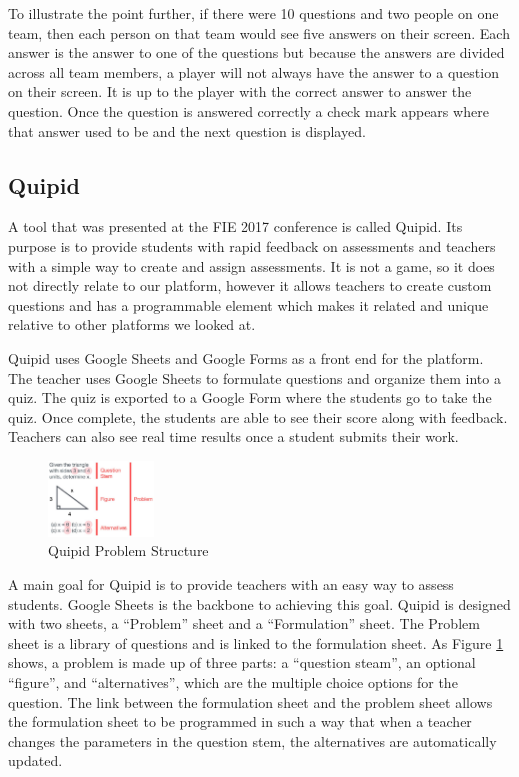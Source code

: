 \documentclass{article}
\begin{document}
        To illustrate the point further, if there were 10 questions and two people on one team, then each person on that team would see five answers on their screen. Each answer is the answer to one of the questions but because the answers are divided across all team members, a player will not always have the answer to a question on their screen. It is up to the player with the correct answer to answer the question. Once the question is answered correctly a check mark appears where that answer used to be and the next question is displayed.
    
    \subsection{Quipid}
        A tool that was presented at the FIE 2017 conference is called Quipid. Its purpose is to provide students with rapid feedback on assessments and teachers with a simple way to create and assign assessments. It is not a game, so it does not directly relate to our platform, however it allows teachers to create custom questions and has a programmable element which makes it related and unique relative to other platforms we looked at.
        \smallskip
        
        Quipid uses Google Sheets and Google Forms as a front end for the platform. The teacher uses Google Sheets to formulate questions and organize them into a quiz. The quiz is exported to a Google Form where the students go to take the quiz. Once complete, the students are able to see their score along with feedback. Teachers can also see real time results once a student submits their work.
        \smallskip
        \begin{figure}
            \centering
            \includegraphics[width=0.25\textwidth]{images/quipid-problem.png}
            \caption{Quipid Problem Structure \cite{quipid}}
            \label{fig:quipid-problem}
        \end{figure}
        \indent A main goal for Quipid is to provide teachers with an easy way to assess students. Google Sheets is the backbone to achieving this goal. Quipid is designed with two sheets, a ``Problem'' sheet and a ``Formulation'' sheet. The Problem sheet is a library of questions and is linked to the formulation sheet. As Figure \ref{fig:quipid-problem} shows, a problem is made up of three parts: a ``question steam'', an optional ``figure'', and ``alternatives'', which are the multiple choice options for the question. The link between the formulation sheet and the problem sheet allows the formulation sheet to be programmed in such a way that when a teacher changes the parameters in the question stem, the alternatives are automatically updated.
        \smallskip
        
\end{document}
